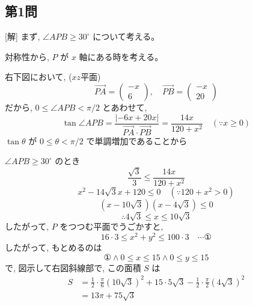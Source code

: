 \documentclass[../main.tex]{subfiles}
\begin{document}
\subsection*{第1問}

[解] まず, $\angle APB \ge 30^\circ$ について考える。

対称性から, $P$ が $x$ 軸にある時を考える。

右下図において, ($xz$平面)
\[
  \vec{PA} =
  \begin{pmatrix} -x \\ 6
  \end{pmatrix}, \quad \vec{PB} =
  \begin{pmatrix} -x \\ 20
  \end{pmatrix}
\]
だから, $0 \le \angle APB < \pi/2$ とあわせて,
\[
  \tan \angle APB = \frac{|-6x + 20x|}{\vec{PA} \cdot \vec{PB}} = \frac{14x}{120 + x^2} \quad (\because x \ge 0)
\]
$\tan \theta$ が $0 \le \theta < \pi/2$ で単調増加であることから

$\angle APB \ge 30^\circ$ のとき
\[
  \frac{\sqrt{3}}{3} \le \frac{14x}{120 + x^2}
\]
\[
  x^2 - 14\sqrt{3}x + 120 \le 0 \quad (\because 120 + x^2 > 0)
\]
\[
  (x - 10\sqrt{3})(x - 4\sqrt{3}) \le 0
\]
\[
  \therefore 4\sqrt{3} \le x \le 10\sqrt{3}
\]
したがって, $P$ をつつむ平面でうごかすと,
\[
  16 \cdot 3 \le x^2 + y^2 \le 100 \cdot 3 \quad \cdots \text{①}
\]
したがって, もとめるのは
\[
  \text{①} \land 0 \le x \le 15 \land 0 \le y \le 15
\]
で, 図示して右図斜線部で, この面積 $S$ は
\[
  \begin{aligned}
    S &= \frac{1}{2} \cdot \frac{\pi}{6} (10\sqrt{3})^2 + 15 \cdot 5\sqrt{3} - \frac{1}{2} \cdot \frac{\pi}{2} (4\sqrt{3})^2 \\
    &= 13\pi + 75\sqrt{3}
  \end{aligned}
\]
\end{document}
